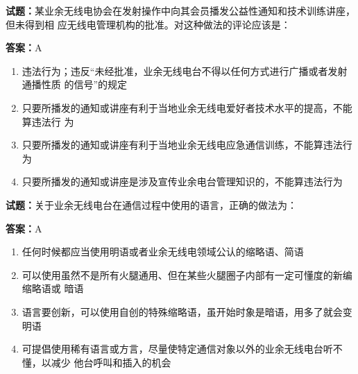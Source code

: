 \documentclass{ctexbook}
\begin{document}
\vspace{1em}

\textbf{试题：}某业余无线电协会在发射操作中向其会员播发公益性通知和技术训练讲座，但未得到相
应无线电管理机构的批准。对这种做法的评论应该是： 

\textbf{答案：}A 

\begin{enumerate}[leftmargin=3em]
  \item 违法行为；违反“未经批准，业余无线电台不得以任何方式进行广播或者发射通播性质
的信号”的规定 

  \item 只要所播发的通知或讲座有利于当地业余无线电爱好者技术水平的提高，不能算违法行
为 

  \item 只要所播发的通知或讲座有利于当地业余无线电应急通信训练，不能算违法行为 

  \item 只要所播发的通知或讲座是涉及宣传业余电台管理知识的，不能算违法行为 

\end{enumerate}





\vspace{1em}

\textbf{试题：}关于业余无线电台在通信过程中使用的语言，正确的做法为： 

\textbf{答案：}A 

\begin{enumerate}[leftmargin=3em]
  \item 任何时候都应当使用明语或者业余无线电领域公认的缩略语、简语 

  \item 可以使用虽然不是所有火腿通用、但在某些火腿圈子内部有一定可懂度的新编缩略语或
暗语 

  \item 语言要创新，可以使用自创的特殊缩略语，虽开始时象是暗语，用多了就会变明语 

  \item 可提倡使用稀有语言或方言，尽量使特定通信对象以外的业余无线电台听不懂，以减少
他台呼叫和插入的机会 

\end{enumerate}



\end{document}
